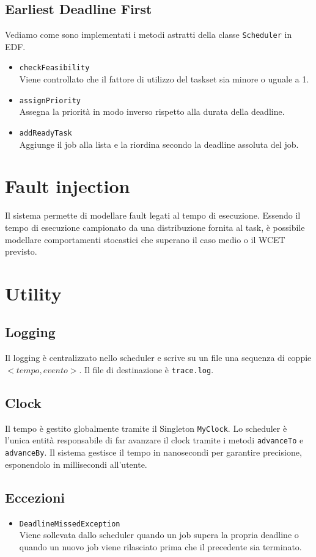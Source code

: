 \subsection{Earliest Deadline First}
Vediamo come sono implementati i metodi astratti della classe \texttt{Scheduler} in EDF.
\begin{itemize}
    \item \texttt{checkFeasibility} \\
        Viene controllato che il fattore di utilizzo del taskset sia minore o uguale a 1.
    \item \texttt{assignPriority} \\
        Assegna la priorità in modo inverso rispetto alla durata della deadline.
    \item \texttt{addReadyTask} \\
        Aggiunge il job alla lista e la riordina secondo la deadline assoluta del job.
\end{itemize}

\section{Fault injection}
Il sistema permette di modellare fault legati al tempo di esecuzione. Essendo il tempo di esecuzione campionato da una distribuzione fornita al task, è possibile modellare comportamenti stocastici che superano il caso medio o il WCET previsto.

\section{Utility}
\subsection{Logging}
Il logging è centralizzato nello scheduler e scrive su un file una sequenza di coppie $<tempo, evento>$. Il file di destinazione è \texttt{trace.log}.

\subsection{Clock}
\label{subsec:clock}
Il tempo è gestito globalmente tramite il Singleton \texttt{MyClock}. Lo scheduler è l'unica entità responsabile di far avanzare il clock tramite i metodi \texttt{advanceTo} e \texttt{advanceBy}. Il sistema gestisce il tempo in nanosecondi per garantire precisione, esponendolo in millisecondi all'utente.

\subsection{Eccezioni}
\begin{itemize}
    \item \texttt{DeadlineMissedException} \\
        Viene sollevata dallo scheduler quando un job supera la propria deadline o quando un nuovo job viene rilasciato prima che il precedente sia terminato.
\end{itemize}
